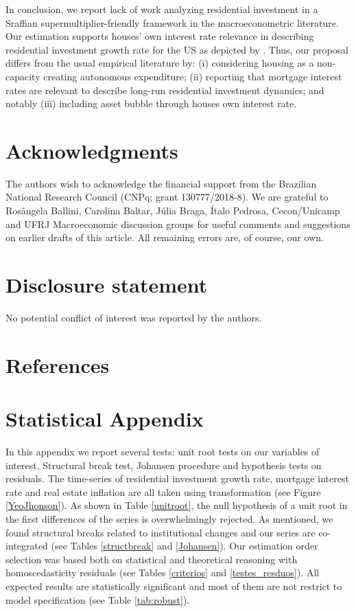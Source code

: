 \documentclass[12pt, a4paper]{article}
\begin{document}
In conclusion,  we report lack of work analyzing residential investment in a Sraffian supermultiplier-friendly framework in the macroeconometric literature.
Our estimation supports houses' own interest rate relevance in describing residential investment growth rate for the US as depicted by \textcite{teixeira_crescimento_2015}.
Thus, our  proposal differs from the usual empirical literature by:
	(i) considering housing as a non-capacity creating autonomous expenditure;
	(ii) reporting that mortgage interest rates are relevant to describe long-run residential investment dynamics; and notably 
	(iii) including asset bubble through houses own interest rate.


\section*{Acknowledgments}
\label{sec:orgd341529}
\noindent The authors wish to acknowledge the financial support from the Brazilian National Research Council (CNPq; grant 130777/2018-8). We are grateful to Rosângela Ballini, Carolina Baltar, Júlia Braga, Ítalo Pedrosa, Cecon/Unicamp and UFRJ Macroeconomic discussion groups for useful comments and suggestions on earlier drafts of this article. All remaining errors are, of course, our own.


\section*{Disclosure statement}
\label{sec:org29e79d7}
No potential conflict of interest was reported by the authors.

\section*{References}
\label{sec:org7a114a2}
\printbibliography[heading=none]


\appendix
\section{Statistical Appendix}
\label{sec:org23a66d7}
\label{appen:A}

In this appendix we report several tests: unit root tests on our variables of interest, Structural break test, Johansen procedure and hypothesis tests on residuals. 
The time-series of residential investment growth rate, mortgage interest rate and real estate inflation are all taken using \textcite{yeo_new_2000} transformation (see Figure \ref{YeoJhonson}).
As shown in Table \ref{unitroot}, the null hypothesis of a unit root in the first differences of the series is overwhelmingly rejected.
As mentioned, we found structural breaks related to institutional changes and our series are co-integrated (see Tables \ref{structbreak} and \ref{Johansen}).
Our estimation order selection was based both on statistical and theoretical reasoning with homoscedasticity residuals (see Tables \ref{criterios} and \ref{testes_resduos}).
All expected results are statistically significant and most of them are not restrict to model specification (see Table \ref{tab:robust}).
\end{document}
